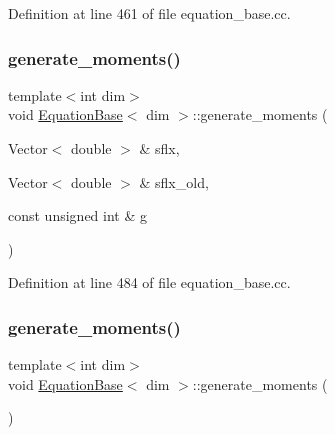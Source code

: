 Definition at line 461 of file equation\+\_\+base.\+cc.

\mbox{\label{class_equation_base_a893affe5706a8798bed68bb4ff531eec}} 
\subsubsection{\texorpdfstring{generate\+\_\+moments()}{generate\_moments()}\hspace{0.1cm}{\footnotesize\ttfamily [2/3]}}
{\footnotesize\ttfamily template$<$int dim$>$ \\
void \hyperlink{class_equation_base}{Equation\+Base}$<$ dim $>$\+::generate\+\_\+moments (\begin{DoxyParamCaption}\item[{Vector$<$ double $>$ \&}]{sflx,  }\item[{Vector$<$ double $>$ \&}]{sflx\+\_\+old,  }\item[{const unsigned int \&}]{g }\end{DoxyParamCaption})\hspace{0.3cm}{\ttfamily [virtual]}}



Definition at line 484 of file equation\+\_\+base.\+cc.

\mbox{\label{class_equation_base_ab74a0a15d0d2a20022cafad8dd6f46aa}} 
\subsubsection{\texorpdfstring{generate\+\_\+moments()}{generate\_moments()}\hspace{0.1cm}{\footnotesize\ttfamily [3/3]}}
{\footnotesize\ttfamily template$<$int dim$>$ \\
void \hyperlink{class_equation_base}{Equation\+Base}$<$ dim $>$\+::generate\+\_\+moments (\begin{DoxyParamCaption}{ }\end{DoxyParamCaption})\hspace{0.3cm}{\ttfamily [virtual]}}



